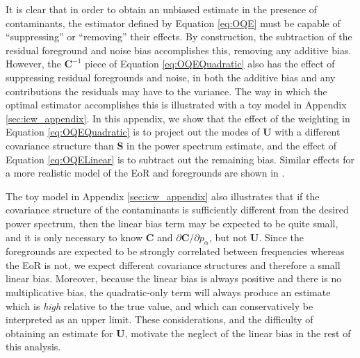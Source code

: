 \documentclass[preprint2,numberedappendix,tighten]{aastex6}  %
\newcommand{\C}{\mathbf{C}}
\begin{document}
It is clear that in order to obtain an unbiased estimate in the presence of contaminants, the estimator defined by Equation \eqref{eq:OQE} must be capable of ``suppressing'' or ``removing'' their effects. By construction, the subtraction of the residual foreground and noise bias accomplishes this, removing any additive bias. However, the $\mathbf{C}^{-1}$ piece of Equation \eqref{eq:OQEQuadratic} also has the effect of suppressing residual foregrounds and noise, in both the additive bias and any contributions the residuals may have to the variance. The way in which the optimal estimator accomplishes this is illustrated with a toy model in Appendix \ref{sec:icw_appendix}. In this appendix, we show that the effect of the weighting in Equation \ref{eq:OQEQuadratic} is to project out the modes of $\textbf{U}$ with a different covariance structure than $\mathbf{S}$ in the power spectrum estimate, and the effect of Equation \ref{eq:OQELinear} is to subtract out the remaining bias. Similar effects for a more realistic model of the EoR and foregrounds are shown in \citet{liu_tegmark2011}.

The toy model in Appendix \ref{sec:icw_appendix} also illustrates that if the covariance structure of the contaminants is sufficiently different from the desired power spectrum, then the linear bias term may be expected to be quite small, and it is only necessary to know $\C$ and $\partial \C/\partial p_\alpha$, but not $\mathbf{U}$. Since the foregrounds are expected to be strongly correlated between frequencies whereas the EoR is not, we expect different covariance structures and therefore a small linear bias. Moreover, because the linear bias is always positive and there is no multiplicative bias, the quadratic-only term will always produce an estimate which is {\it high} relative to the true value, and which can conservatively be interpreted as an upper limit. These considerations, and the difficulty of obtaining an estimate for $\mathbf{U}$, motivate the neglect of the linear bias in the rest of this analysis.
\end{document}
